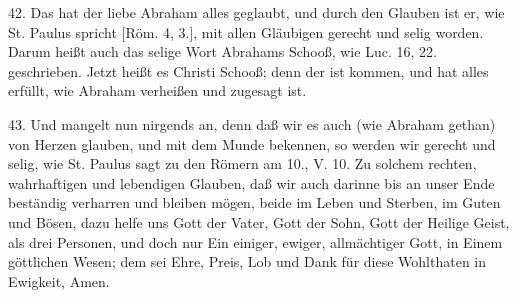 42. Das hat der liebe Abraham alles geglaubt, und durch den Glauben ist er, wie St. Paulus spricht [Röm. 4, 3.], mit allen Gläubigen gerecht und selig worden. Darum heißt auch das selige Wort Abrahams Schooß, wie Luc. 16, 22. geschrieben. Jetzt heißt es Christi Schooß; denn der ist kommen, und hat alles erfüllt, wie Abraham verheißen und zugesagt ist.

43. Und mangelt nun nirgends an, denn daß wir es auch (wie Abraham gethan) von Herzen glauben, und mit dem Munde bekennen, so werden wir gerecht und selig, wie St. Paulus sagt zu den Römern am 10., V. 10. Zu solchem rechten, wahrhaftigen und lebendigen Glauben, daß wir auch darinne bis an unser Ende beständig verharren und bleiben mögen, beide im Leben und Sterben, im Guten und Bösen, dazu helfe uns Gott der Vater, Gott der Sohn, Gott der Heilige Geist, als drei Personen, und doch nur Ein einiger, ewiger, allmächtiger Gott, in Einem göttlichen Wesen; dem sei Ehre, Preis, Lob und Dank für diese Wohlthaten in Ewigkeit, Amen.
